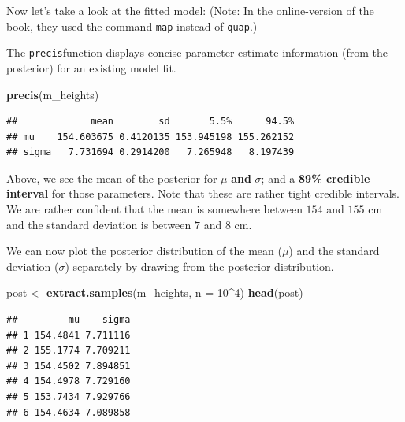 \documentclass[
]{book}
\newenvironment{Shaded}{\begin{snugshade}}{\end{snugshade}}
\newcommand{\AttributeTok}[1]{\textcolor[rgb]{0.13,0.29,0.53}{#1}}
\newcommand{\DecValTok}[1]{\textcolor[rgb]{0.00,0.00,0.81}{#1}}
\newcommand{\FunctionTok}[1]{\textcolor[rgb]{0.13,0.29,0.53}{\textbf{#1}}}
\newcommand{\NormalTok}[1]{#1}
\newcommand{\OtherTok}[1]{\textcolor[rgb]{0.56,0.35,0.01}{#1}}
\newcommand{\SpecialCharTok}[1]{\textcolor[rgb]{0.81,0.36,0.00}{\textbf{#1}}}
\begin{document}
Now let's take a look at the fitted model:
(Note: In the online-version of the book, they used the command \texttt{map} instead of \texttt{quap}.)

The \texttt{precis}function displays concise parameter estimate information
(from the posterior) for an existing model fit.

\begin{Shaded}
\begin{Highlighting}[]
\FunctionTok{precis}\NormalTok{(m\_heights)}
\end{Highlighting}
\end{Shaded}

\begin{verbatim}
##             mean        sd       5.5%      94.5%
## mu    154.603675 0.4120135 153.945198 155.262152
## sigma   7.731694 0.2914200   7.265948   8.197439
\end{verbatim}

Above, we see the mean of the posterior for \(\mu\) \textbf{and} \(\sigma\);
and a \textbf{89\% credible interval} for those parameters.
Note that these are rather tight credible intervals. We are rather confident that the mean is somewhere between
\(154\) and \(155\) cm and the standard deviation is between \(7\) and \(8\) cm.

We can now plot the posterior distribution of the mean (\(\mu\)) and the standard
deviation (\(\sigma\)) separately by drawing from the posterior distribution.

\begin{Shaded}
\begin{Highlighting}[]
\NormalTok{post }\OtherTok{\textless{}{-}} \FunctionTok{extract.samples}\NormalTok{(m\_heights, }\AttributeTok{n =} \DecValTok{10}\SpecialCharTok{\^{}}\DecValTok{4}\NormalTok{)}
\FunctionTok{head}\NormalTok{(post)}
\end{Highlighting}
\end{Shaded}

\begin{verbatim}
##         mu    sigma
## 1 154.4841 7.711116
## 2 155.1774 7.709211
## 3 154.4502 7.894851
## 4 154.4978 7.729160
## 5 153.7434 7.929766
## 6 154.4634 7.089858
\end{verbatim}

\begin{Shaded}
\end{Shaded}
\end{document}
